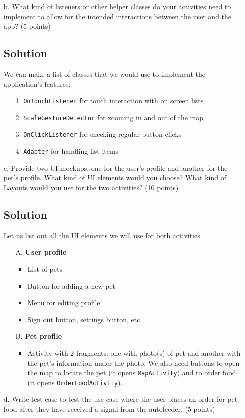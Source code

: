 \documentclass[12pt]{book}
\begin{document}
\begin{itemize}
    \item[b.] What kind of listeners or other helper classes do your activities need to implement to allow for the intended interactions between the user and the app? (5 points)
    
    \subsection*{Solution}
    We can make a list of classes that we would use to implement the application's features:

    \begin{itemize}
        \item[1.] \texttt{OnTouchListener} for touch interaction with on screen lists
        \item[2.] \texttt{ScaleGestureDetector} for zooming in and out of the map
        \item[3.] \texttt{OnClickListener} for checking regular button clicks
        \item[4.] \texttt{Adapter} for handling list items
    \end{itemize}
    

    \item[c.] Provide two UI mockups, one for the user's profile and another for the pet's profile. What kind of UI elements would you choose? What kind of Layouts would you use for the two activities? (10 points)
    
    \subsection*{Solution}

    Let us list out all the UI elements we will use for both activities

    \begin{itemize}
        \item[A.] \textbf{User profile}
        \begin{itemize}
            \item List of pets
            \item Button for adding a new pet
            \item Menu for editing profile
            \item Sign out button, settings button, etc.
        \end{itemize}
        \item[B.] \textbf{Pet profile}
        \begin{itemize}
            \item Activity with 2 fragments: one with photo(s) of pet and another with the pet's information under the photo. We also need buttons to open the map to locate the pet (it opens \texttt{MapActivity}) and to order food (it opens \texttt{OrderFoodActivity}).
        \end{itemize}
    \end{itemize}
    

    \item[d.] Write test case to test the use case where the user places an order for pet food after they have received a signal from the autofeeder. (5 points)
\end{itemize}
\end{document}
